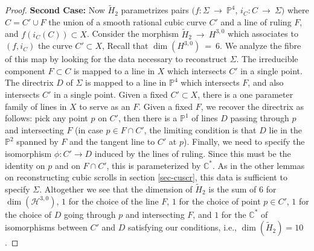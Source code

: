 \documentclass[twoside,12pt,reqno]{amsart}
\theoremstyle{plain}
\theoremstyle{definition}
\newcommand{\Hdg}[2]{\mathcal{H}^{#1,#2}}
\newcommand{\CC}{\mathbb{C}}
\newcommand{\PP}{\mathbb{P}}
\def\P{{\mathbb P}}
\def\ps{\vspace{4pt}}
\begin{document}
\begin{proof}
\ps

\textbf{Second Case:}
Now $\widetilde{H}_2$ parametrizes pairs $(f:\Sigma~\rightarrow~
\PP^4$, $i_C:C~\rightarrow~ \Sigma)$ where $C=C'\cup F$ the union of a
smooth rational cubic curve $C'$ and a line of ruling $F$, and
$f(i_C(C))\subset X$.  Consider the morphism $\widetilde{H}_2~\rightarrow~
H^{3,0}$ which associates to $(f,i_C)$ the curve $C'\subset X$, 
Recall that $\dim (H^{3,0}) ~=~ 6$.  We analyze the fibre of this map
by looking for the data necessary to reconstruct $\Sigma$.
The irreducible component $F\subset C$ is mapped to a line in $X$ which
intersects $C'$ in a single point.  The directrix $D$ of $\Sigma$ is mapped
to a line in $\PP^4$ which intersects $F$, and also intersects $C'$ in a 
single point. Given a fixed $C'\subset X$, there is a one parameter family
of lines in $X$ to serve as an $F$.  Given a fixed $F$, we recover the directrix
as follows: pick any point $p$ on $C'$,  then there is a $\P^1$ of lines $D$
passing through $p$ and intersecting $F$ (in case $p\in F\cap C'$, the limiting
condition is that $D$ lie in the $\PP^2$ spanned by $F$ and the tangent line
to $C'$ at $p$). Finally, we need to specify the isomorphism $\phi:C'\rightarrow
D$ induced by the lines of ruling.  Since this must be the identity on $p$ and
on $F\cap C'$, this is parameterized by $\CC^{*}$.  As in the other lemmas
on reconstructing cubic scrolls in section \ref{sec-cuscr}, this data is
sufficient to specify $\Sigma$.  Altogether we see that the dimension
of $\widetilde{H}_2$ is the sum of $6$ for $\dim(\Hdg{3}{0})$, $1$ for
the choice of the line $F$, $1$ for the choice of point $p\in C'$, 
$1$ for the choice of $D$ going through $p$ and intersecting $F$, and $1$ 
for the $\CC^{*}$ of isomorphisms between $C'$ and $D$ satisfying our
conditions, i.e., $\dim(\widetilde{H}_2)=10$.


\ps


\end{proof}
\end{document}
